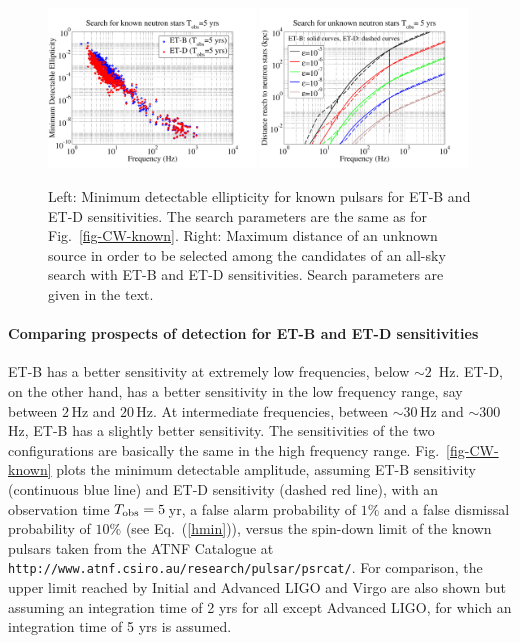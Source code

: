 \begin{figure}
\centering
\includegraphics[width=0.49\textwidth]{./Sec_ET_ScienceCase/known_pulsars_ET_epsilon}
\includegraphics[width=0.49\textwidth]{./Sec_ET_ScienceCase/blind_rmax_ET}
\caption{Left: Minimum detectable ellipticity for known pulsars for 
ET-B and ET-D sensitivities. The search parameters are the same as 
for Fig.~\ref{fig-CW-known}. Right: Maximum distance of an unknown 
source in order to be selected among the candidates of an all-sky 
search with ET-B and ET-D sensitivities. Search parameters are given in the text.}
\label{sensi_knownpulsar}
\end{figure}
\paragraph{Comparing prospects of detection for ET-B and ET-D sensitivities}
ET-B has a better sensitivity at extremely low frequencies, below $\sim 2$~Hz. 
ET-D, on the other hand, has a better sensitivity in the low frequency range, 
say between $2$\,Hz and $20$\,Hz. At intermediate frequencies, between 
$\sim 30$\,Hz and $\sim 300$\,Hz, ET-B has a slightly better sensitivity. 
The sensitivities of the two configurations are basically the same in the 
high frequency range.  Fig.~\ref{fig-CW-known} plots the minimum detectable
amplitude, assuming ET-B sensitivity (continuous blue line) and ET-D sensitivity 
(dashed red line), with an observation time
$T_{\rm obs}=5\,$yr, a false alarm probability of $1\%$ and a false dismissal
probability of $10\%$ (see Eq.~(\ref{hmin})), versus the spin-down limit of
the known pulsars taken from the ATNF Catalogue at
{\tt http://www.atnf.csiro.au/research/pulsar/psrcat/}. For comparison, the
upper limit reached by Initial and Advanced LIGO and Virgo are also shown but
assuming an integration time of 2 yrs for all except Advanced LIGO, for
which an integration time of 5 yrs is assumed.

